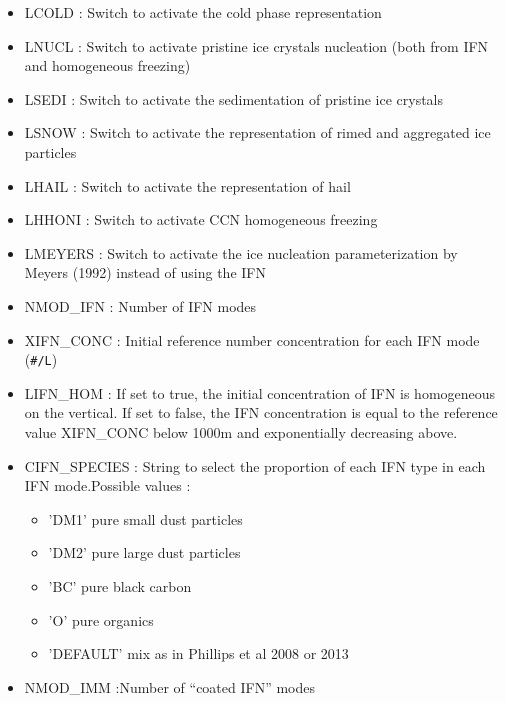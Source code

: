 \begin{itemize}
\item
{}
LCOLD : Switch to activate the cold phase representation
\item
{}
LNUCL : Switch to activate pristine ice crystals nucleation (both from IFN and homogeneous freezing)
\item
{}
LSEDI : Switch to activate the sedimentation of pristine ice crystals
\item
{}
LSNOW : Switch to activate the representation of rimed and aggregated ice particles
\item
{}
LHAIL : Switch to activate the representation of hail
\item
{}
LHHONI : Switch to activate CCN homogeneous freezing
\item
{}
LMEYERS : Switch to activate the ice nucleation parameterization by Meyers (1992) instead of using the IFN
\item
{}
NMOD\_IFN : Number of IFN modes
\item
{}
XIFN\_CONC : Initial reference number concentration for each IFN mode (\verb?#/L?)
\item
{}
LIFN\_HOM : If set to true, the initial concentration of IFN is homogeneous on the vertical. If set to false, the IFN concentration is equal to the reference value XIFN\_CONC below 1000m and exponentially decreasing above.
\item
{}
CIFN\_SPECIES : String to select the proportion of each IFN type in each IFN mode.Possible values :
\begin{itemize}
\item 'DM1' pure small dust particles
\item 'DM2' pure large dust particles
\item 'BC'  pure black carbon
\item 'O'   pure organics
\item 'DEFAULT' mix as in Phillips et al 2008 or 2013
\end{itemize}
\item
{}
NMOD\_IMM :Number of “coated IFN” modes

\end{itemize}

